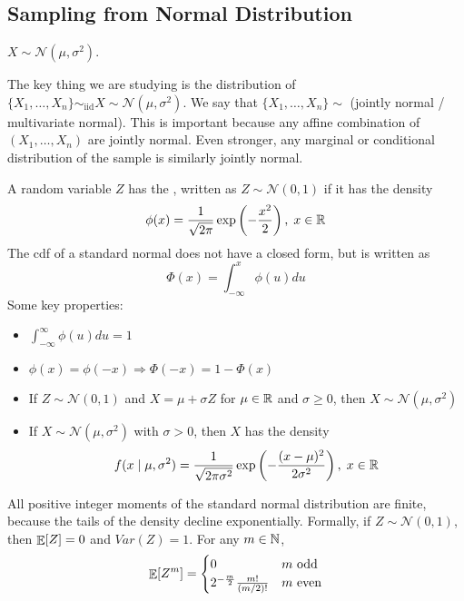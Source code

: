 \documentclass[10pt]{article}
\begin{document}
\subsection{Sampling from Normal Distribution}

\begin{assumption}
	$X \sim \mathcal{N}(\mu,\sigma^2)$. 
\end{assumption}

The key thing we are studying is the distribution of $\{X_1,\dots,X_n\} \sim_\text{iid} X \sim \mathcal{N}(\mu,\sigma^2)$. We say that $\{X_1,\dots,X_n\} \sim$ (jointly normal / multivariate normal). This is important because any affine combination of $(X_1,\dots,X_n)$ are jointly normal. Even stronger, any marginal or conditional distribution of the sample is similarly jointly normal.


\begin{definition}
	A random variable $Z$ has the , written as $Z \sim \mathcal{N}(0,1)$ if it has the density
	\[
	\phi(x) = \frac{1}{\sqrt{2\pi}} \exp\left(-\frac{x^2}{2} \right), \; x\in\mathbb{R}
	\]
	The cdf of a standard normal does not have a closed form, but is written as
	\[
	\Phi(x) = \int_{-\infty}^x \phi(u) du
	\]
	Some key properties:
	\begin{itemize}
		\item $\int_{-\infty}^\infty \phi(u) du = 1$
		\item $\phi(x) = \phi(-x) \Rightarrow \Phi(-x) = 1 - \Phi(x)$
		\item If $Z \sim \mathcal{N}(0,1)$ and $X = \mu + \sigma Z$ for $\mu \in \mathbb{R}$ and $\sigma \ge 0$, then $X \sim \mathcal{N}(\mu,\sigma^2)$
		\item If $X \sim \mathcal{N}(\mu,\sigma^2)$ with $\sigma > 0$, then $X$ has the density 
		\[
		f(x \mid \mu,\sigma^2) = \frac{1}{\sqrt{2\pi\sigma^2}} \exp\left( - \frac{(x-\mu)^2}{2\sigma^2}\right),\;x \in \mathbb{R}
		\]
	\end{itemize}
\end{definition}

\begin{definition}
	All positive integer moments of the standard normal distribution are finite, because the tails of the density decline exponentially. Formally, if $Z \sim \mathcal{N}(0,1)$, then $\mathop{\mathbb{E}}[Z] = 0$ and $Var(Z) = 1$. For any $m \in \mathbb{N}$, 
	\[
	\mathop{\mathbb{E}}[Z^m] = \begin{cases}0 & m \text{ odd} \\ 2^{-\frac{m}{2}} \frac{m!}{(m/2)!} & m \text{ even} \end{cases}
	\]
\end{definition}
\end{document}
